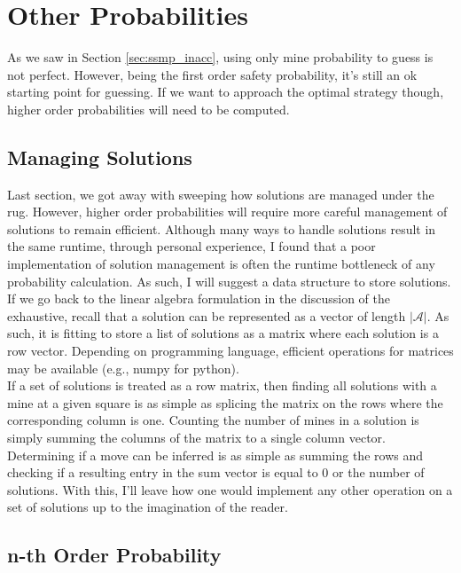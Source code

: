 \section{Other Probabilities}

As we saw in Section \ref{sec:ssmp_inacc}, using only mine probability to guess is not perfect. However, being the first order safety probability, it's still an ok starting point for guessing. If we want to approach the optimal strategy though, higher order probabilities will need to be computed.\\

\subsection{Managing Solutions}

Last section, we got away with sweeping how solutions are managed under the rug. However, higher order probabilities will require more careful management of solutions to remain efficient. Although many ways to handle solutions result in the same runtime, through personal experience, I found that a poor implementation of solution management is often the runtime bottleneck of any probability calculation. As such, I will suggest a data structure to store solutions.\\

If we go back to the linear algebra formulation in the discussion of the exhaustive, recall that a solution can be represented as a vector of length $|\mathcal{A}|$. As such, it is fitting to store a list of solutions as a matrix where each solution is a row vector. Depending on programming language, efficient operations for matrices may be available (e.g., numpy for python).\\

If a set of solutions is treated as a row matrix, then finding all solutions with a mine at a given square is as simple as splicing the matrix on the rows where the corresponding column is one. Counting the number of mines in a solution is simply summing the columns of the matrix to a single column vector. Determining if a move can be inferred is as simple as summing the rows and checking if a resulting entry in the sum vector is equal to 0 or the number of solutions. With this, I'll leave how one would implement any other operation on a set of solutions up to the imagination of the reader.\\

\subsection{n-th Order Probability}

